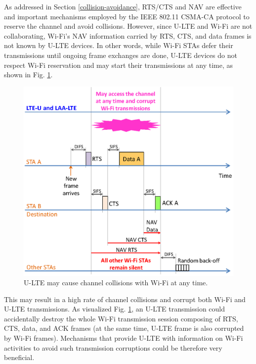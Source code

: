 As addressed in Section \ref{collision-avoidance}, RTS/CTS and NAV are effective and important mechanisms employed by the IEEE 802.11 CSMA-CA protocol to reserve the channel and avoid collisions. However, since U-LTE and Wi-Fi are not collaborating, Wi-Fi's NAV information carried by RTS, CTS, and data frames is not known by U-LTE devices. In other words, while Wi-Fi STAs defer their transmissions until ongoing frame exchanges are done, U-LTE devices do not respect Wi-Fi reservation and may start their transmissions at any time, as shown in Fig. \ref{figs:LTE-U-enhancement-RTS-CTS-NAV}.
\begin{figure}[!ht]
	\centering
	\includegraphics[width=0.7\columnwidth]{figs/LTE-U-enhancement-RTS-CTS-NAV}
	\caption{U-LTE may cause channel collisions with Wi-Fi at any time.}
	\label{figs:LTE-U-enhancement-RTS-CTS-NAV}
\end{figure}
This may result in a high rate of channel collisions and corrupt both Wi-Fi and U-LTE transmissions. As visualized Fig. \ref{figs:LTE-U-enhancement-RTS-CTS-NAV}, an U-LTE transmission could accidentally destroy the whole Wi-Fi transmission session composing of RTS, CTS, data, and ACK frames (at the same time, U-LTE frame is also corrupted by Wi-Fi frames). Mechanisms that provide U-LTE with information on Wi-Fi activities to avoid such transmission corruptions could be therefore very beneficial.

